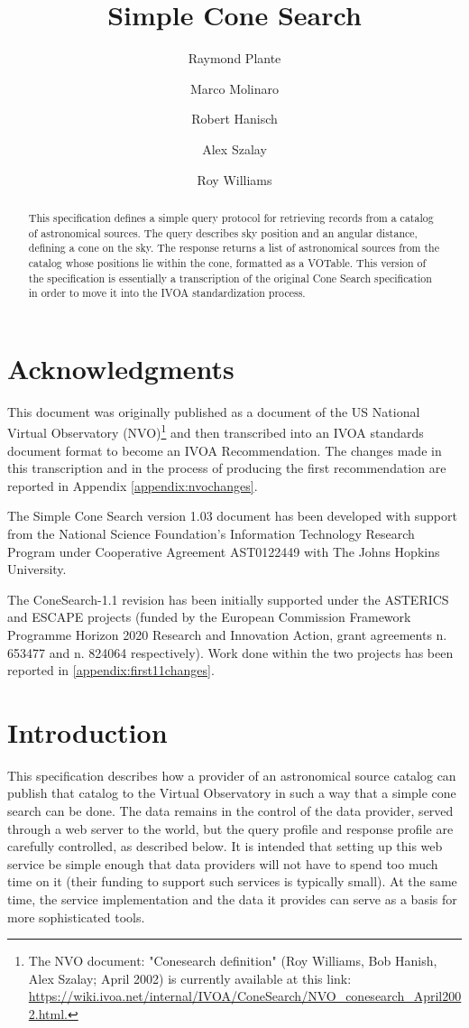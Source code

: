 \documentclass[11pt,a4paper]{ivoa}
\title{Simple Cone Search}
\author[http://www.ivoa.net/twiki/bin/view/IVOA/RayPlante]{Raymond Plante}
\author[http://www.ivoa.net/twiki/bin/view/IVOA/MarcoMolinaro]{Marco Molinaro}
\author[http://www.ivoa.net/twiki/bin/view/IVOA/BobHanisch]{Robert Hanisch}
\author[http://www.ivoa.net/twiki/bin/view/IVOA/AlexSzalay]{Alex Szalay}
\author[http://www.ivoa.net/twiki/bin/view/IVOA/RoyWilliams]{Roy Williams}
\begin{document}
\begin{abstract} This specification defines a simple
query protocol for retrieving records from a catalog of astronomical
sources. The query describes sky position and an angular distance,
defining a cone on the sky. The response returns a list of astronomical
sources from the catalog whose positions lie within the cone, formatted
as a VOTable. This version of the specification is essentially a
transcription of the original Cone Search specification in order to move
it into the IVOA standardization process. \end{abstract}


\section*{Acknowledgments} 

This document was originally published as a
document of the US National Virtual Observatory (NVO)\footnote{The NVO
document: "Conesearch definition" (Roy Williams, Bob Hanish, Alex
Szalay; April 2002) is currently available at this link:
\url{https://wiki.ivoa.net/internal/IVOA/ConeSearch/NVO\_conesearch\_April2002.html.}}
and then transcribed into an IVOA standards document format to become
an IVOA Recommendation. The changes made in this transcription and in
the process of producing the first recommendation are reported in
Appendix \ref{appendix:nvochanges}.

The Simple Cone Search version 1.03 document has been developed with
support from the National Science Foundation's Information Technology
Research Program under Cooperative Agreement AST0122449 with The Johns
Hopkins University.

The ConeSearch-1.1 revision has been initially supported under the
ASTERICS and ESCAPE projects (funded by the European Commission
Framework Programme Horizon 2020 Research and Innovation Action, grant
agreements n. 653477 and n. 824064 respectively). Work done within the
two projects has been reported in \ref{appendix:first11changes}.

\section{Introduction}

This specification describes how a provider of an astronomical source
catalog can publish that catalog to the Virtual Observatory in such a
way that a simple cone search can be done. The data remains in the
control of the data provider, served through a web server to the world,
but the query profile and response profile are carefully controlled, as
described below. It is intended that setting up this web service be
simple enough that data providers will not have to spend too much time
on it (their funding to support such services is typically small). At
the same time, the service implementation and the data it provides can
serve as a basis for more sophisticated tools.
\end{document}
